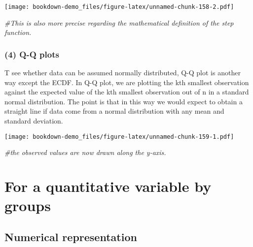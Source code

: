 \documentclass[]{book}
\newenvironment{Shaded}{\begin{snugshade}}{\end{snugshade}}
\newcommand{\KeywordTok}[1]{\textcolor[rgb]{0.13,0.29,0.53}{\textbf{#1}}}
\newcommand{\DataTypeTok}[1]{\textcolor[rgb]{0.13,0.29,0.53}{#1}}
\newcommand{\DecValTok}[1]{\textcolor[rgb]{0.00,0.00,0.81}{#1}}
\newcommand{\StringTok}[1]{\textcolor[rgb]{0.31,0.60,0.02}{#1}}
\newcommand{\CommentTok}[1]{\textcolor[rgb]{0.56,0.35,0.01}{\textit{#1}}}
\newcommand{\OperatorTok}[1]{\textcolor[rgb]{0.81,0.36,0.00}{\textbf{#1}}}
\newcommand{\NormalTok}[1]{#1}
\theoremstyle{definition}
\theoremstyle{definition}
\theoremstyle{definition}
\theoremstyle{remark}
\begin{document}
\texttt{[image: bookdown-demo\_files/figure-latex/unnamed-chunk-158-2.pdf]}

\begin{Shaded}
\begin{Highlighting}[]
\CommentTok{#This is also more precise regarding the mathematical definition of the step function.}
\end{Highlighting}
\end{Shaded}

\subsubsection{(4) Q-Q plots}\label{q-q-plots}

T see whether data can be assumed normally distributed, Q-Q plot is
another way except the ECDF. In Q-Q plot, we are plotting the kth
smallest observation against the expected value of the kth smallest
observation out of n in a standard normal distribution. The point is
that in this way we would expect to obtain a straight line if data come
from a normal distribution with any mean and standard deviation.

\begin{Shaded}
\end{Shaded}

\texttt{[image: bookdown-demo\_files/figure-latex/unnamed-chunk-159-1.pdf]}

\begin{Shaded}
\begin{Highlighting}[]
\CommentTok{#the observed values are now drawn along the y-axis. }
\end{Highlighting}
\end{Shaded}

\section{For a quantitative variable by
groups}\label{for-a-quantitative-variable-by-groups}

\subsection{Numerical representation}\label{numerical-representation-1}
\end{document}
